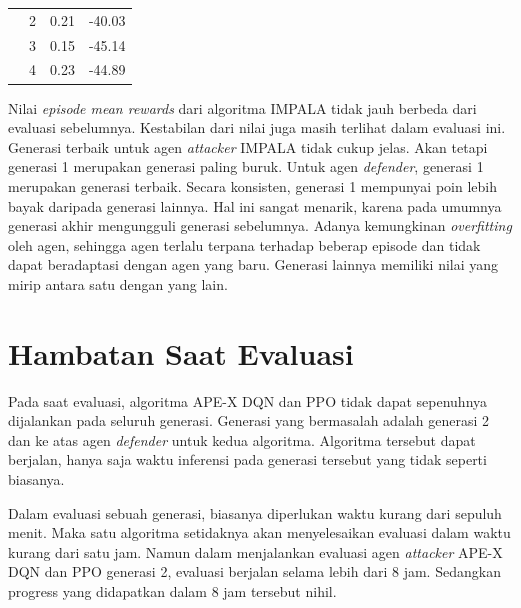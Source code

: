 \begin{table}[H]
\begin{tabular}{|c|c|l|l|}
    & 2                                                                            & 0.21                                                                                                  & -40.03                                                                                                \\ \cline{2-4} 
    & 3                                                                            & 0.15                                                                                                  & -45.14                                                                                                \\ \cline{2-4} 
    & 4                                                                            & 0.23                                                                                                  & -44.89                                                                                                \\ \hline
  \end{tabular}
\end{table}

Nilai \emph{episode mean rewards} dari algoritma IMPALA tidak jauh berbeda dari evaluasi sebelumnya.
Kestabilan dari nilai juga masih terlihat dalam evaluasi ini.
Generasi terbaik untuk agen \emph{attacker} IMPALA tidak cukup jelas.
Akan tetapi generasi 1 merupakan generasi paling buruk.
Untuk agen \emph{defender}, generasi 1 merupakan generasi terbaik.
Secara konsisten, generasi 1 mempunyai poin lebih bayak daripada generasi lainnya.
Hal ini sangat menarik, karena pada umumnya generasi akhir mengungguli generasi sebelumnya.
Adanya kemungkinan \emph{overfitting} oleh agen, sehingga agen terlalu terpana terhadap beberap episode dan tidak dapat beradaptasi dengan agen yang baru.
Generasi lainnya memiliki nilai yang mirip antara satu dengan yang lain.

\section{Hambatan Saat Evaluasi}
Pada saat evaluasi, algoritma APE-X DQN dan PPO tidak dapat sepenuhnya dijalankan pada seluruh generasi.
Generasi yang bermasalah adalah generasi 2 dan ke atas agen \emph{defender} untuk kedua algoritma.
Algoritma tersebut dapat berjalan, hanya saja waktu inferensi pada generasi tersebut yang tidak seperti biasanya.

Dalam evaluasi sebuah generasi, biasanya diperlukan waktu kurang dari sepuluh menit.
Maka satu algoritma setidaknya akan menyelesaikan evaluasi dalam waktu kurang dari satu jam.
Namun dalam menjalankan evaluasi agen \emph{attacker} APE-X DQN dan PPO generasi 2, evaluasi berjalan selama lebih dari 8 jam.
Sedangkan progress yang didapatkan dalam 8 jam tersebut nihil.

